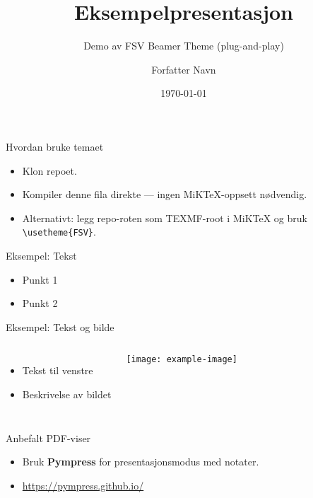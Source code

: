 \documentclass{beamer}
\title{Eksempelpresentasjon}
\subtitle{Demo av FSV Beamer Theme (plug-and-play)}
\author{Forfatter Navn}
\institute{Fagskolen Viken}
\date{\today}
\begin{document}
	
	\begin{frame}
		\titlepage
	\end{frame}
	
	\begin{frame}{Hvordan bruke temaet}
		\begin{itemize}
			\item Klon repoet.
			\item Kompiler denne fila direkte — ingen MiKTeX-oppsett nødvendig.
			\item Alternativt: legg repo-roten som TEXMF-root i MiKTeX og bruk \texttt{\textbackslash usetheme\{FSV\}}.
		\end{itemize}
	\end{frame}
	
	\begin{frame}{Eksempel: Tekst}
		\begin{itemize}
			\item Punkt 1
			\item Punkt 2
		\end{itemize}
	\end{frame}
	
	\begin{frame}{Eksempel: Tekst og bilde}
		\begin{columns}
			\column{0.5\textwidth}
			\begin{itemize}
				\item Tekst til venstre
				\item Beskrivelse av bildet
			\end{itemize}
			\column{0.5\textwidth}
			\texttt{[image: example-image]}
		\end{columns}
	\end{frame}
	
	\begin{frame}{Anbefalt PDF-viser}
		\begin{itemize}
			\item Bruk \textbf{Pympress} for presentasjonsmodus med notater.
			\item \url{https://pympress.github.io/}
		\end{itemize}
	\end{frame}
	
\end{document}
